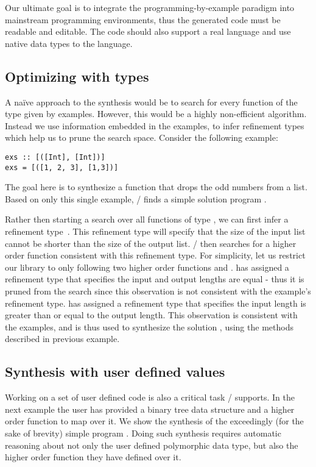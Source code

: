 Our ultimate goal is to integrate the programming-by-example paradigm 
into mainstream programming environments, thus the generated code must be readable and editable.
The code should also support a real language and use native data types to the language.


\subsection{Optimizing with types}
\label{sec:exampleFilter}

A na\"ive approach to the synthesis would be to search 
for every function of the type given by examples. However, this would be
a highly non-efficient algorithm.
Instead we use information embedded in the examples, to infer refinement types which help us to prune the search space.
Consider the following example:
\begin{lstlisting}
exs :: [([Int], [Int])]
exs = [([1, 2, 3], [1,3])]
\end{lstlisting}
The goal here is to synthesize a function that drops the odd numbers from a list. Based on only this single example, \ourTool/ finds a simple solution program .

Rather then starting a search over all functions of type \codeinline{[Int] -> [Int]}, we can first infer a refinement 
type~\cite{DBLP:conf/icfp/VazouSJVJ14}.
This refinement type will specify that the size of the input list cannot
be shorter than the size of the output list.
\ourTool/ then searches for a higher order function consistent with this refinement type.
For simplicity, let us restrict our library to only following two
higher order functions  and .
 has assigned a refinement type that specifies the input and output lengths are equal - thus it is pruned from the search since this observation is not consistent with the example's refinement type.
 has assigned a refinement type that specifies the input length is greater than or equal to the output length.
This observation is consistent with the examples, and is thus used to synthesize the solution , using the methods described in previous example.


\subsection{Synthesis with user defined values}


Working on a set of user defined code is also a critical task \ourTool/ supports. 
In the next example the user has provided a binary tree data structure and a higher order function to map over it. We show the synthesis of the exceedingly (for the sake of brevity) simple program .
Doing such synthesis requires automatic reasoning about not only the user defined polymorphic data type, but also the higher order function they have defined over it.

